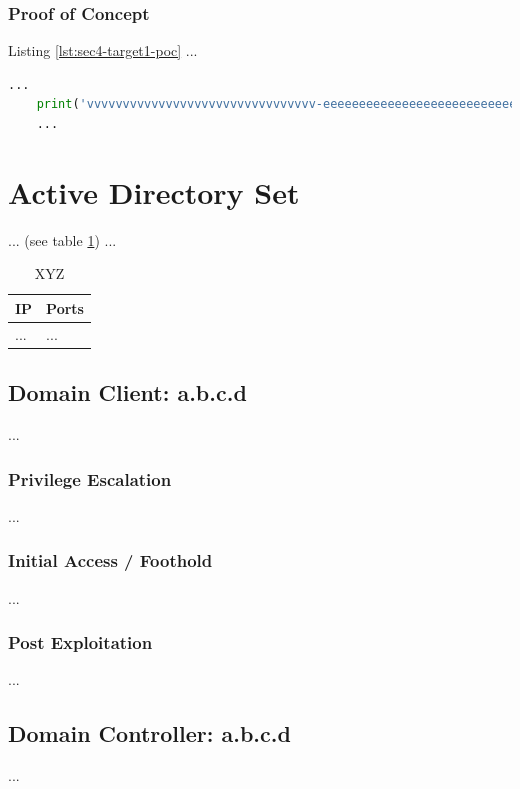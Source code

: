 \subsubsection{Proof of Concept}\label{sec:sec4-target1-poc}
%
Listing \ref{lst:sec4-target1-poc} ...\\

\begin{lstlisting}[language=Python,caption={Proof of Concept}, label={lst:sec4-target1-poc}]
    ...
    print('vvvvvvvvvvvvvvvvvvvvvvvvvvvvvvvv-eeeeeeeeeeeeeeeeeeeeeeeeeeeeeeeeeeeeeeeeeee-looooooooooooooooooooooong-striiiiiiiiiiiiiing')
    ...
\end{lstlisting}
%
%
%
\section{Active Directory Set}\label{sec:sec5}
%
... (see table \ref{tbl:sec5-xyz}) ...

\begin{table}[H]
    \begin{tabularx}{\textwidth}{l|l}
        \textbf{IP} & \textbf{Ports} \\
        \hline
        ... & ...\\
    \end{tabularx}
    \caption{XYZ\label{tbl:sec5-xyz}}
\end{table}
%
%
%
\subsection{Domain Client: a.b.c.d}\label{sec:sec5-client1}
%
...
%
%
%
\subsubsection{Privilege Escalation}\label{sec:sec5-client1-priv}
%
...
%
%
%
\subsubsection{Initial Access / Foothold}\label{sec:sec5-client1-init}
%
...
%
%
%
\subsubsection{Post Exploitation}\label{sec:sec5-client1-post}
%
...
%
%
%
\subsection{Domain Controller: a.b.c.d}\label{sec:sec5-dc1}
%
...
%
%
%
